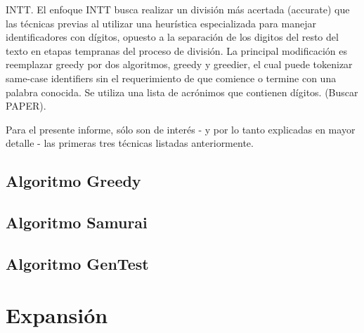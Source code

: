 INTT. El enfoque INTT busca realizar un división más acertada (accurate) que las técnicas previas al utilizar una heurística especializada para manejar identificadores con dígitos, opuesto a la separación de los digitos del resto del texto en etapas tempranas del proceso de división. La principal modificación es reemplazar greedy por dos algoritmos, greedy y greedier, el cual puede tokenizar same-case identifiers sin el requerimiento de que comience o termine con una palabra conocida. Se utiliza una lista de acrónimos que contienen dígitos. (Buscar PAPER).

Para el presente informe, sólo son de interés - y por lo tanto explicadas en mayor detalle - las primeras tres técnicas listadas anteriormente.

\subsection{Algoritmo Greedy}
\subsection{Algoritmo Samurai}
\subsection{Algoritmo GenTest}

\section{Expansión}
